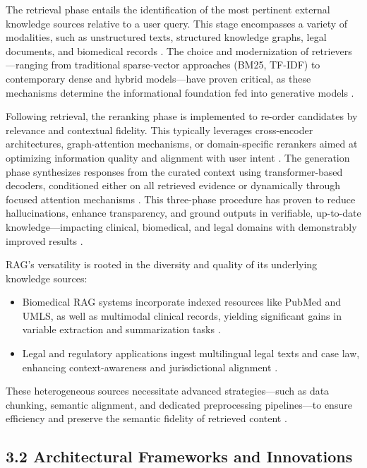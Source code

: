 \documentclass[11pt]{article}
\begin{document}
The retrieval phase entails the identification of the most pertinent external knowledge sources relative to a user query. This stage encompasses a variety of modalities, such as unstructured texts, structured knowledge graphs, legal documents, and biomedical records \cite{ref42,ref49,ref51,ref52,ref54,ref55,ref63}. The choice and modernization of retrievers—ranging from traditional sparse-vector approaches (BM25, TF-IDF) to contemporary dense and hybrid models—have proven critical, as these mechanisms determine the informational foundation fed into generative models \cite{ref10,ref35,ref52,ref54}.

Following retrieval, the reranking phase is implemented to re-order candidates by relevance and contextual fidelity. This typically leverages cross-encoder architectures, graph-attention mechanisms, or domain-specific rerankers aimed at optimizing information quality and alignment with user intent \cite{ref4,ref36,ref37}. The generation phase synthesizes responses from the curated context using transformer-based decoders, conditioned either on all retrieved evidence or dynamically through focused attention mechanisms \cite{ref5,ref16,ref17,ref37}. This three-phase procedure has proven to reduce hallucinations, enhance transparency, and ground outputs in verifiable, up-to-date knowledge—impacting clinical, biomedical, and legal domains with demonstrably improved results \cite{ref64}.

RAG’s versatility is rooted in the diversity and quality of its underlying knowledge sources:

\begin{itemize}
    \item Biomedical RAG systems incorporate indexed resources like PubMed and UMLS, as well as multimodal clinical records, yielding significant gains in variable extraction and summarization tasks \cite{ref42,ref52,ref54,ref55,ref63}.
    \item Legal and regulatory applications ingest multilingual legal texts and case law, enhancing context-awareness and jurisdictional alignment \cite{ref49,ref51,ref63}.
\end{itemize}

These heterogeneous sources necessitate advanced strategies—such as data chunking, semantic alignment, and dedicated preprocessing pipelines—to ensure efficiency and preserve the semantic fidelity of retrieved content \cite{ref52,ref54}.

\subsection{3.2 Architectural Frameworks and Innovations}
\end{document}
